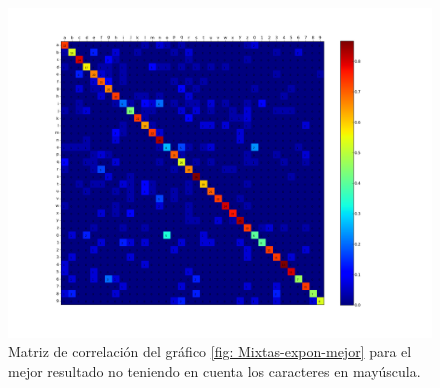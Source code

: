 			\begin{figure}[htbp]
				\centerline{\includegraphics[scale=0.4]{img/resultados/mixtas/best_expon_matrix_Alpha0,1_4080-4_ins.png}}
				\caption[Matriz de correlación ``case insensitive'' para mixtas expon]{Matriz de correlación del gráfico \ref{fig: Mixtas-expon-mejor} para el mejor resultado no teniendo en cuenta los caracteres en mayúscula.}
				\label{fig: MatrizIns-Mixtas-expon}
			\end{figure}